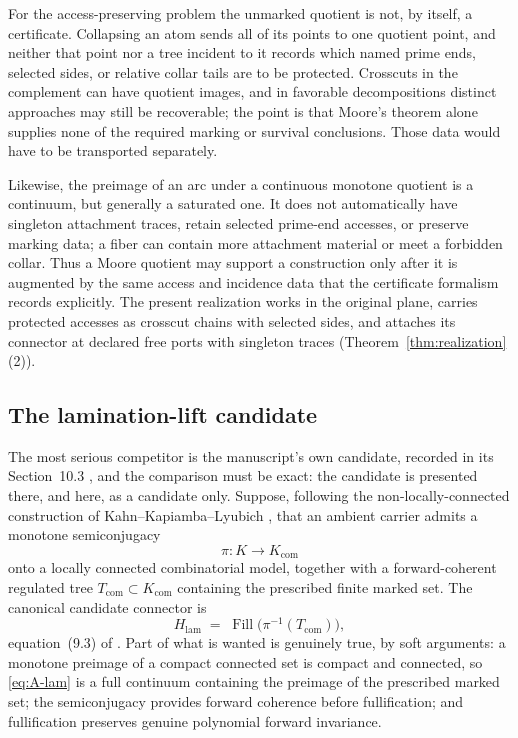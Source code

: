 \documentclass[11pt,reqno]{amsart}
\theoremstyle{definition}
\theoremstyle{remark}
\newcommand{\Fill}{\operatorname{Fill}}
\begin{document}
For the access-preserving problem the unmarked quotient is not, by itself,
a certificate.  Collapsing an atom sends all of its points to one quotient
point, and neither that point nor a tree incident to it records which named
prime ends, selected sides, or relative collar tails are to be protected.
Crosscuts in the complement can have quotient images, and in favorable
decompositions distinct approaches may still be recoverable; the point is
that Moore's theorem alone supplies none of the required marking or
survival conclusions.  Those data would have to be transported separately.

Likewise, the preimage of an arc under a continuous monotone quotient is
a continuum, but generally a saturated one.  It does not automatically
have singleton attachment traces, retain selected prime-end accesses, or
preserve marking data; a fiber can contain more attachment material or
meet a forbidden collar.  Thus a Moore quotient may support a construction only
after it is augmented by the same access and incidence data that the
certificate formalism records explicitly.  The present realization works
in the original plane, carries protected accesses as crosscut chains with
selected sides, and attaches its connector at declared free ports with
singleton traces (Theorem~\ref{thm:realization}(2)).

\subsection{The lamination-lift candidate}
\label{subsec:A-comp-lamination}

The most serious competitor is the manuscript's own candidate, recorded
in its Section~10.3 \cite{MWman}, and the comparison must be exact:
the candidate is presented there, and here, as a candidate only.
Suppose, following the non-locally-connected construction of
Kahn--Kapiamba--Lyubich \cite{KKL26}, that an ambient carrier admits a
monotone semiconjugacy
\[
\pi\colon K\longrightarrow K_{\mathrm{com}}
\]
onto a locally connected combinatorial model, together with a
forward-coherent regulated tree $T_{\mathrm{com}}\subset K_{\mathrm{com}}$
containing the prescribed finite marked set.  The canonical candidate connector is
\begin{equation}\label{eq:A-lam}
H_{\mathrm{lam}}\;=\;\Fill\bigl(\pi^{-1}(T_{\mathrm{com}})\bigr),
\end{equation}
equation~(9.3) of \cite{MWman}.  Part of what is wanted is genuinely
true, by soft arguments: a monotone preimage of a compact connected set
is compact and connected, so \eqref{eq:A-lam} is a full continuum
containing the preimage of the prescribed marked set; the semiconjugacy provides forward
coherence before fullification; and fullification preserves genuine
polynomial forward invariance.
\end{document}
